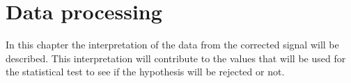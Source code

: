 \chapter{Data processing}
In this chapter the interpretation of the data from the corrected signal will be described. This interpretation will contribute to the values that will be used for the statistical test to see if the hypothesis will be rejected or not.  